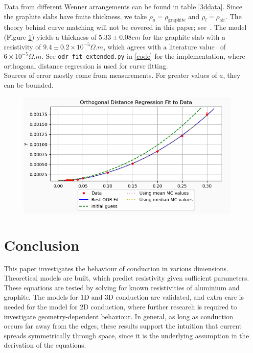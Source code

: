 \documentclass[12pt]{IEEEtran}
\begin{document}
Data from different Wenner arrangements can be found in table \ref{3ddata}. Since the graphite slabs have finite thickness, we take $\rho_a = \rho_{\text{graphite}}$ and $\rho_l = \rho_{\text{air}}$. The theory behind curve matching will not be covered in this paper; see~\cite{curve}. The model (Figure \ref{odr}) yields a thickness of $5.33 \pm 0.08 \unit{cm}$ for the graphite slab with a resistivity of $9.4 \pm 0.2 \times 10^{-5} \unit{\Omega.m}$, which agrees with a literature value~\cite{res} of $6 \times 10^{-5} \unit{\Omega.m}$. See \verb|odr_fit_extended.py| in \ref{code} for the implementation, where orthogonal distance regression is used for curve fitting. \\

Sources of error mostly come from measurements. For greater values of $a$, they can be bounded.

\begin{figure}\label{odr}
    \begin{center}
    \includegraphics[scale=0.5]{odrfit.png}
    \end{center}
\end{figure}

\section{Conclusion}

This paper investigates the behaviour of conduction in various dimensions. Theoretical models are built, which predict resistivity given sufficient parameters. These equations are tested by solving for known resistivities of aluminium and graphite. The models for 1D and 3D conduction are validated, and extra care is needed for the model for 2D conduction, where further research is required to investigate geometry-dependent behaviour. In general, as long as conduction occurs far away from the edges, these results support the intuition that current spreads symmetrically through space, since it is the underlying assumption in the derivation of the equations.
\end{document}
